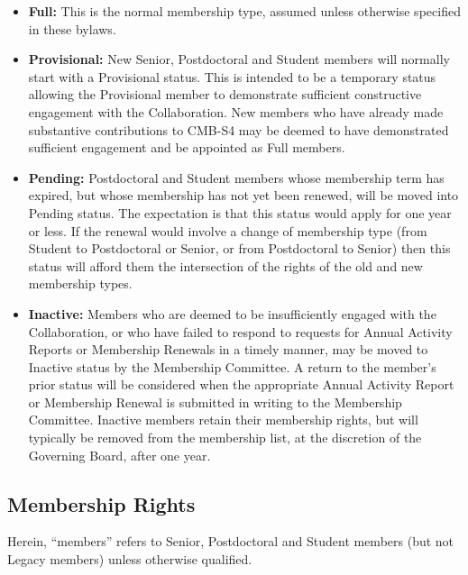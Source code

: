 \documentclass[12pt]{article}
\begin{document}
\begin{itemize}

\item {\bf Full:}
This is the normal membership type, assumed unless otherwise specified in these bylaws.

\item {\bf Provisional:}
New Senior, Postdoctoral and Student members will normally start with a Provisional status. This is intended to be a temporary status allowing the Provisional member to demonstrate sufficient constructive engagement with the Collaboration. New members who have already made substantive contributions to CMB-S4 may be deemed to have demonstrated sufficient engagement and be appointed as Full members.

\item {\bf Pending:}
Postdoctoral and Student members whose membership term has expired, but whose membership has not yet been renewed, will be moved into Pending status.
The expectation is that this status would apply for one year or less.
If the renewal would involve a change of membership type (from Student to Postdoctoral or Senior, or from Postdoctoral to Senior) then this status will afford them the intersection of the rights of the old and new membership types.

\item {\bf Inactive:}
Members who are deemed to be insufficiently engaged with the Collaboration, or who have failed to respond to requests for Annual Activity Reports or Membership Renewals in a timely manner, may be moved to Inactive status by the Membership Committee. A return to the member's prior status will be considered when the appropriate Annual Activity Report or Membership Renewal is submitted in writing to the Membership Committee. Inactive members retain their membership rights, but will typically be removed from the membership list, at the discretion of the Governing Board, after one year.

\end{itemize}

\subsection{Membership Rights}\label{sec:memberrights}

Herein, ``members'' refers to Senior, Postdoctoral and Student members (but not Legacy members) unless otherwise qualified.
\end{document}
